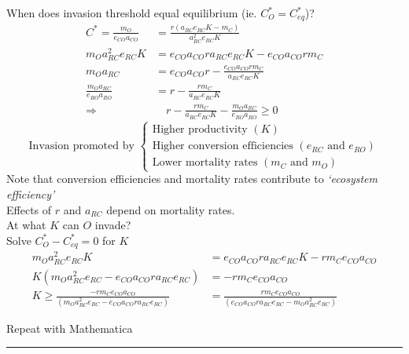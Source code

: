 \documentclass{article}
\newcommand{\note}[1]{\colorbox{gray!30}{#1}}
\newcommand{\ind}{\-\hspace{1cm}}
\newcommand*\circled[1]{\tikz[baseline=(char.base)]{
            \node[shape=circle,draw,inner sep=2pt] (char) {#1};}}
\begin{document}
\ind When does invasion threshold equal equilibrium (ie. $C_O^* = C_{eq}^*$)?
\begin{align*}
	C^* = \frac{m_O}{e_{CO}a_{CO}} &= \frac{r(a_{RC}e_{RC}K-m_C)}{a_{RC}^2 e_{RC} K}\\
	m_O a_{RC}^2 e_{RC} K &= e_{CO} a_{CO} r a_{RC} e_{RC} K - e_{CO} a_{CO} r m_C\\
	m_O a_{RC}  & = e_{CO} a_{CO} r - \frac{e_{CO} a_{CO} r m_C}{a_{RC}e_{RC} K}\\
	\frac{m_O a_{RC}}{e_{RO} a_{RO}}  & = r - \frac{ r m_C}{a_{RC}e_{RC} K}\\
	\Rightarrow & \quad   r - \frac{ r m_C}{a_{RC}e_{RC} K} - \frac{m_O a_{RC}}{e_{RO} a_{RO}}  \geq 0
\end{align*}
\begin{equation*}
\text{Invasion promoted by }\begin{cases}
\text{Higher productivity }(K)\\
\text{Higher conversion efficiencies }(e_{RC} \text{ and } e_{RO})\\
\text{Lower mortality rates }(m_C \text{ and } m_O)
\end{cases}
\end{equation*}
\ind \ind Note that conversion efficiencies and mortality rates contribute to \emph{`ecosystem efficiency'}\\
\ind \ind Effects of $r$ and $a_{RC}$ depend on mortality rates.\\

\circled{4b}At what $K$ can $O$ invade?\\
\ind Solve $C_O^* - C_{eq}^* = 0$ for $K$
\begin{align*}
	m_O a_{RC}^2 e_{RC} K &= e_{CO} a_{CO} r a_{RC} e_{RC} K - r m_C e_{CO} a_{CO} \\
	K(m_O a_{RC}^2 e_{RC}-e_{CO} a_{CO} r a_{RC} e_{RC}) & =  - r m_C e_{CO} a_{CO} \\
	K  \geq   \frac{- r m_C e_{CO} a_{CO}}{(m_O a_{RC}^2 e_{RC}-e_{CO} a_{CO} r a_{RC} e_{RC})} & =  \frac{r m_C e_{CO} a_{CO}}{(e_{CO} a_{CO} r a_{RC} e_{RC}-m_O a_{RC}^2 e_{RC})}
\end{align*}

\note{Repeat with Mathematica}


\rule[0.5ex]{\linewidth}{1pt}
\end{document}
